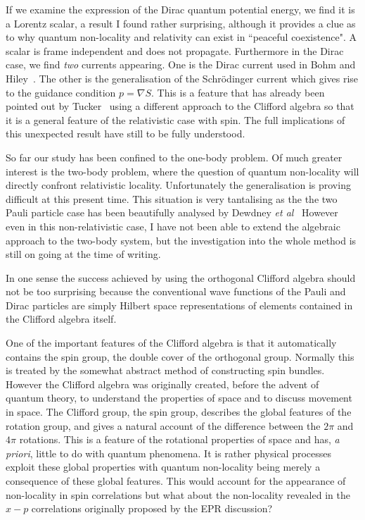 \documentclass[12pt]{article}
\begin{document}
If we examine the expression of the Dirac quantum potential energy, we find it is a Lorentz scalar, a result I found rather surprising, although it provides a clue as to why quantum non-locality and relativity can exist in ``peaceful coexistence".  A scalar is frame independent and does not propagate. Furthermore in the Dirac case, we find  {\em two} currents appearing.  One is the Dirac current used in Bohm and Hiley~\cite{dbbh93}.  The other is the generalisation of the Schr\"{o}dinger current which gives rise to the guidance condition $p=\nabla S$.  This is a feature that has already been pointed out by Tucker~\cite{rt88} using a different approach to the Clifford algebra so that it is a general feature of the relativistic case with spin.
 The full implications of this unexpected result have still to be fully understood. 
 
 So far our study has been confined to the one-body problem.  Of much greater interest is the two-body problem, where the question of quantum non-locality will directly confront relativistic locality. Unfortunately the generalisation  is proving difficult at this present time.  This situation is very tantalising as the  the two Pauli particle case has been beautifully analysed by Dewdney {\em et al}~\cite{cdphak88}
However even in this non-relativistic case, I have not been able to extend the algebraic approach to the two-body system, but the investigation into the whole method is still on going at the time of writing.

In one sense the success achieved by using the orthogonal Clifford algebra should not be too surprising because the conventional wave functions of the Pauli and Dirac particles are simply Hilbert space representations of elements contained in the Clifford algebra itself.  


One of the important features of the Clifford algebra is that it automatically contains the spin group, the double cover of the orthogonal group.  Normally this is treated by the somewhat abstract method of constructing spin bundles.  However the Clifford algebra was originally created, before the advent of quantum theory, to understand the properties of space and to discuss movement in space.  The Clifford group, the spin group, describes the global features of the rotation group, and gives a natural account of the difference between the $2\pi$ and $4\pi$ rotations.  This is a feature of the rotational properties of space and has, {\em a priori}, little to do with quantum phenomena.  It is rather physical processes exploit these global properties with quantum non-locality being merely a consequence of these global features.  This would account for the appearance of non-locality in spin correlations but what about the non-locality revealed in the $x-p$ correlations originally proposed by the EPR discussion?
\end{document}
